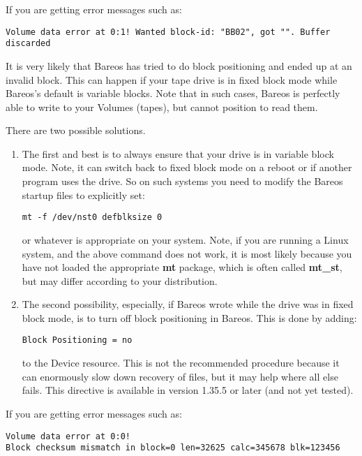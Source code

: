 {If you are getting error messages such as:

\footnotesize
\begin{verbatim}
Volume data error at 0:1! Wanted block-id: "BB02", got "". Buffer discarded
\end{verbatim}
\normalsize

It is very likely that Bareos has tried to do block positioning and ended up
at an invalid block. This can happen if your tape drive is in fixed block mode
while Bareos's default is variable blocks. Note that in such cases, Bareos is
perfectly able to write to your Volumes (tapes), but cannot position to read
them.

There are two possible solutions.

\begin{enumerate}
\item The first and  best is to always ensure that your drive is in  variable
   block mode. Note, it can switch back to  fixed block mode on a reboot or if
   another program  uses the drive. So on such systems you  need to modify the
   Bareos startup files  to explicitly set:

\footnotesize
\begin{verbatim}
mt -f /dev/nst0 defblksize 0
\end{verbatim}
\normalsize

or whatever is appropriate on your system. Note, if you are running a Linux
system, and the above command does not work, it is most likely because you
have not loaded the appropriate {\bf mt} package, which is often called
{\bf mt\_st}, but may differ according to your distribution.

\item The second possibility, especially, if Bareos wrote  while the drive was
   in fixed block mode, is to turn  off block positioning in Bareos. This is done
   by  adding:

\footnotesize
\begin{verbatim}
Block Positioning = no
\end{verbatim}
\normalsize

to the Device resource. This is not the recommended  procedure because it can
enormously slow down  recovery of files, but it may help where all else
fails. This directive is available in version 1.35.5  or later (and not yet
tested).
\end{enumerate}

If you are getting error messages such as:
\footnotesize
\begin{verbatim}
Volume data error at 0:0!
Block checksum mismatch in block=0 len=32625 calc=345678 blk=123456
\end{verbatim}
\normalsize

}
